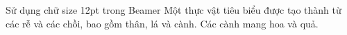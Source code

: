 \documentclass[12pt]{beamer}
\begin{document}
\begin{frame}{Sử dụng chữ size 12pt trong Beamer}
  \justifying
  Một thực vật tiêu biểu được tạo thành từ các rễ và các chồi, bao gồm thân, lá và cành. Các cành mang hoa và quả.
\end{frame}
\end{document}

